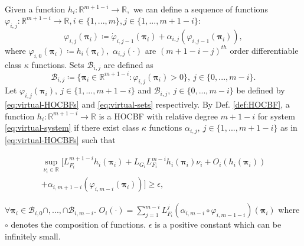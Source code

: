Given a function $h_{i}:\mathbb{R}^{m+1-i}\to\mathbb{R},$ we can define a sequence of functions $\varphi_{i,j}:\mathbb{R}^{m+1-i}\to\mathbb{R}, i \in\{1,...,m\}, j \in\{1,...,m+1-i\}:$
\begin{equation}
\label{eq:virtual-HOCBFs}
\varphi_{i,j}(\boldsymbol{\pi}_{i})\coloneqq\dot{\varphi}_{i,j-1}(\boldsymbol{\pi}_{i})+\alpha_{i,j}(\varphi_{i,j-1}(\boldsymbol{\pi}_{i})),
\end{equation}
where $\varphi_{i,0}(\boldsymbol{\pi}_{i})\coloneqq h_{i}(\boldsymbol{\pi}_{i}),$ $\alpha_{i,j}(\cdot)$ are $(m+1-i-j)^{th}$ order differentiable class $\kappa$ functions. Sets $\mathcal{B}_{i,j}$ are defined as
\begin{equation}
\label{eq:virtual-sets}
\mathcal B_{i,j}\coloneqq \{\boldsymbol{\pi}_{i}\in\mathbb{R}^{m+1-i}:\varphi_{i,j}(\boldsymbol{\pi}_{i})>0\}, \ j\in \{0,...,m-i\}. 
\end{equation}
Let $\varphi_{i,j}(\boldsymbol{\pi}_{i}),\ j\in \{1,...,m+1-i\}$ and $\mathcal B_{i,j},\ j\in \{0,...,m-i\}$ be defined by \eqref{eq:virtual-HOCBFs} and \eqref{eq:virtual-sets} respectively. By Def. \ref{def:HOCBF}, a function $h_{i}:\mathbb{R}^{m+1-i}\to\mathbb{R}$ is a HOCBF with relative degree $m+1-i$ for system \eqref{eq:virtual-system} if there exist class $\kappa$ functions $\alpha_{i,j},\ j\in \{1,...,m+1-i\}$ as in \eqref{eq:virtual-HOCBFs} such that
\begin{small}
\begin{equation}
\label{eq:highest-SHOCBF}
\begin{split}
\sup_{\nu_{i}\in \mathbb{R}}[L_{F_{i}}^{m+1-i}h_{i}(\boldsymbol{\pi}_{i})+L_{G_{i}}L_{F_{i}}^{m-i}h_{i}(\boldsymbol{\pi}_{i})\nu_{i}+O_{i}(h_{i}(\boldsymbol{\pi}_{i}))\\
+ \alpha_{i,m+1-i}(\varphi_{i,m-i}(\boldsymbol{\pi}_{i}))] \ge \epsilon,
\end{split}
\end{equation}
\end{small}
$\forall\boldsymbol{\pi}_{i}\in \mathcal B_{i,0}\cap,...,\cap \mathcal B_{i,m-i}$. $O_{i}(\cdot)=\sum_{j=1}^{m-i}L_{F_{i}}^{j}(\alpha_{i,m-i}\circ\varphi_{i,m-1-i})(\boldsymbol{\pi}_{i}) $ where $\circ$ denotes the composition of functions. $\epsilon$ is a positive constant which can be infinitely small. 

